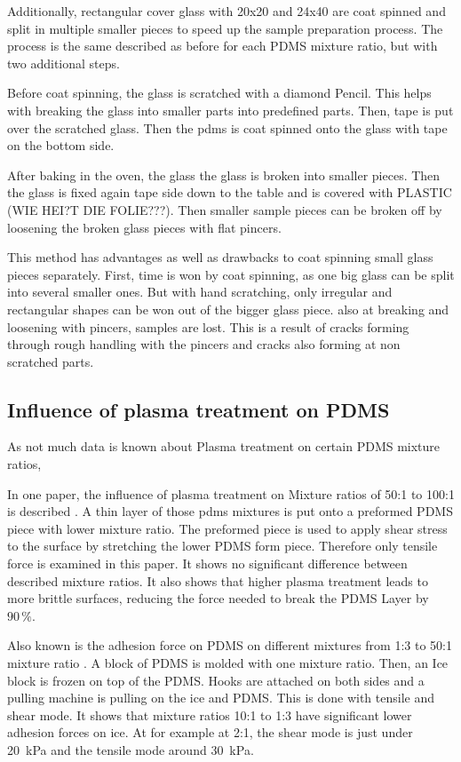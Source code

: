 Additionally, rectangular cover glass with 20x20 and 24x40 are coat spinned and split in multiple smaller pieces to speed up the sample preparation process. The process is the same described as before for each PDMS mixture ratio, but with two additional steps.

Before coat spinning, the glass is scratched with a diamond Pencil. This helps with breaking the glass into smaller parts into predefined parts. Then, tape is put over the scratched glass. Then the pdms is coat spinned onto the glass with tape on the bottom side. 

After baking in the oven, the glass the glass is broken into smaller pieces. Then the glass is fixed again tape side down to the table and is covered with PLASTIC (WIE HEI?T DIE FOLIE???). Then smaller sample pieces can be broken off by loosening the broken glass pieces with flat pincers.

This method has advantages as well as drawbacks to coat spinning small glass pieces separately. First, time is won by coat spinning, as one big glass can be split into several smaller ones. But with hand scratching, only irregular and rectangular shapes can be won out of the bigger glass piece. also at breaking and loosening with pincers, samples are lost. This is a result of cracks forming through rough handling with the pincers and cracks also forming at non scratched parts.

\subsection{Influence of plasma treatment on PDMS}

As not much data is known about Plasma treatment on certain PDMS mixture ratios, 

In one paper, the influence of plasma treatment on Mixture ratios of 50:1 to 100:1 is described  \cite{Ohishi.2017}. A thin layer of those pdms mixtures is put onto a preformed PDMS piece with lower mixture ratio. The preformed piece is used to apply shear stress to the surface by stretching the lower PDMS form piece. Therefore only tensile force is examined in this paper. It shows no significant difference between described mixture ratios. It also shows that higher plasma treatment leads to more brittle surfaces, reducing the force needed to break the PDMS Layer by $90\,\%$.

Also known is the adhesion force on PDMS on different mixtures from 1:3 to 50:1 mixture ratio \cite{IbanezIbanez.2022}. A block of PDMS is molded with one mixture ratio. Then, an Ice block is frozen on top of the PDMS. Hooks are attached on both sides and a pulling machine is pulling on the ice and PDMS. This is done with tensile and shear mode. It shows that mixture ratios 10:1 to 1:3 have significant lower adhesion forces on ice. At for example at 2:1, the shear mode is just under \SI{20}{\kilo\pascal} and the tensile mode around \SI{30}{\kilo\pascal}. 

